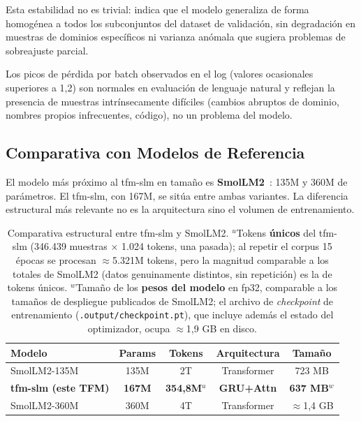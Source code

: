 Esta estabilidad no es trivial: indica que el modelo generaliza de forma homogénea a todos los subconjuntos del dataset de validación, sin degradación en muestras de dominios específicos ni varianza anómala que sugiera problemas de sobreajuste parcial.

Los picos de pérdida por batch observados en el log (valores ocasionales superiores a 1,2) son normales en evaluación de lenguaje natural y reflejan la presencia de muestras intrínsecamente difíciles (cambios abruptos de dominio, nombres propios infrecuentes, código), no un problema del modelo.

\subsection{Comparativa con Modelos de Referencia}
\label{subsec:comparativa}

El modelo más próximo al tfm-slm en tamaño es \textbf{SmolLM2}~\cite{allal2025smollm2}: 135M y 360M de parámetros. El tfm-slm, con 167M, se sitúa entre ambas variantes. La diferencia estructural más relevante no es la arquitectura sino el volumen de entrenamiento.

\begin{table}[H]
\centering
\begin{tabularx}{\textwidth}{|X|c|c|c|c|}
\hline
\textbf{Modelo} & \textbf{Params} & \textbf{Tokens} & \textbf{Arquitectura} & \textbf{Tamaño} \\ \hline
SmolLM2-135M & 135M & 2T & Transformer & 723 MB \\ \hline
\textbf{tfm-slm (este TFM)} & \textbf{167M} & \textbf{354,8M$^{u}$} & \textbf{GRU+Attn} & \textbf{637 MB$^{w}$} \\ \hline
SmolLM2-360M & 360M & 4T & Transformer & $\approx$1,4 GB \\ \hline
\end{tabularx}
\caption{Comparativa estructural entre tfm-slm y SmolLM2. $^{u}$Tokens \textbf{únicos} del tfm-slm (346.439 muestras $\times$ 1.024 tokens, una pasada); al repetir el corpus 15 épocas se procesan $\approx$5.321M tokens, pero la magnitud comparable a los totales de SmolLM2 (datos genuinamente distintos, sin repetición) es la de tokens únicos. $^{w}$Tamaño de los \textbf{pesos del modelo} en fp32, comparable a los tamaños de despliegue publicados de SmolLM2; el archivo de \textit{checkpoint} de entrenamiento (\texttt{.output/checkpoint.pt}), que incluye además el estado del optimizador, ocupa $\approx$1,9 GB en disco.}
\label{tab:comparativa_modelos}
\end{table}


